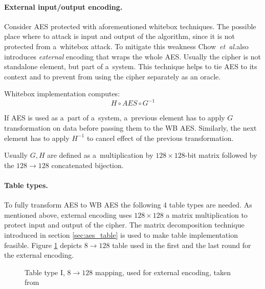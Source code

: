 \documentclass[11pt,oneside,final]{fithesis2}
\newcommand{\eal}{\emph{et~al.}}
\begin{document}
    \paragraph*{External input/output encoding.}
    Consider AES protected with aforementioned whitebox techniques. The possible place where to attack is input and output of the algorithm, since it is not protected 
    from a~whitebox attack. To mitigate this weakness Chow~\eal also introduces \emph{external} encoding that wraps the whole AES. Usually the cipher is not standalone element,
    but part of a~system. This technique helps to tie AES to its context and to prevent from using the cipher separately as an oracle.

    Whitebox implementation computes:
    \begin{equation}
	H \circ AES \circ G^{-1}
    \end{equation}
    
    If AES is used as a~part of a~system, a~previous element has to apply $G$ transformation on data before passing them to the WB AES. Similarly, the next element has to apply
    $H^{-1}$ to cancel effect of the previous transformation. 
    
    Usually $G, H$ are defined as a~multiplication by $128\times128$-bit matrix followed by the $128 \rightarrow 128$ concatenated bijection. 

    
    \paragraph*{Table types.} To fully transform AES to WB AES the following 4 table types are needed.
    As mentioned above, external encoding uses $128\times128$ a matrix multiplication to protect input and output of the cipher. 
    The matrix decomposition technique introduced in section \ref{sec:aes_table} is used to make table implementation feasible. Figure \ref{fig:aes_t1} depicts
    $8\rightarrow128$ table used in the first and the last round for the external encoding.

    \begin{figure}[!htb]
    \begin{center}
    \leavevmode
    \centerline{}
    \end{center}
    \caption{Table type I, $8\rightarrow128$ mapping, used for external encoding, taken from~\citep{wyseurPhd}}
    \label{fig:aes_t1}
    \end{figure}
    
\end{document}
